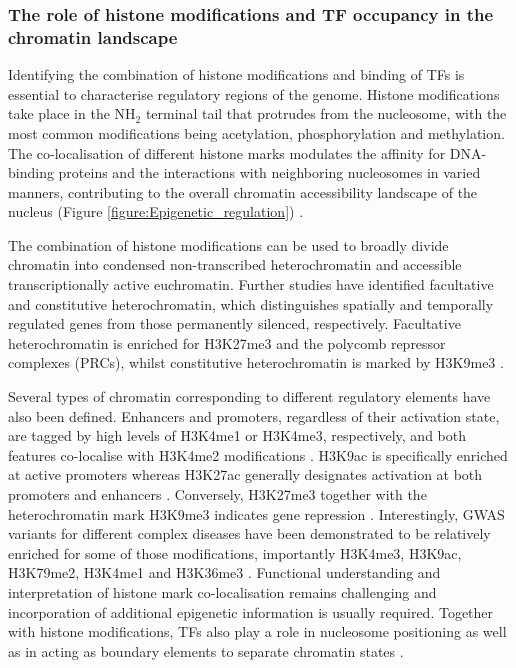 \subsubsection{The role of histone modifications and TF occupancy in the chromatin landscape}

Identifying the combination of histone modifications and binding of TFs is essential to characterise regulatory regions of the genome. Histone modifications take place in the NH$_2$ terminal tail that protrudes from the nucleosome, with the most common modifications being acetylation, phosphorylation and methylation. The co-localisation of different histone marks modulates the affinity for DNA-binding proteins and the interactions with neighboring nucleosomes in varied manners, contributing to the overall chromatin accessibility landscape of the nucleus (Figure \ref{figure:Epigenetic_regulation}) \parencite{Jenuwein2001, Bannister2011}.

The combination of histone modifications can be used to broadly divide chromatin into condensed non-transcribed heterochromatin and accessible transcriptionally active euchromatin. Further studies have identified facultative and constitutive heterochromatin, which distinguishes spatially and temporally regulated genes from those permanently silenced, respectively. Facultative heterochromatin is enriched for H3K27me3 and the polycomb repressor complexes (PRCs), whilst constitutive heterochromatin is marked by H3K9me3 \parencite{Hansen2008,Bannister2001}.

Several types of chromatin corresponding to different regulatory elements have also been defined. Enhancers and promoters, regardless of their activation state, are tagged by high levels of H3K4me1 or H3K4me3, respectively, and both features co-localise with H3K4me2 modifications \parencite{Heintzman2007,Hon2009}. H3K9ac is specifically enriched at active promoters whereas H3K27ac generally designates activation at both promoters and enhancers \parencite{Hon2009,Creyghton2010}. Conversely, H3K27me3 together with the heterochromatin mark H3K9me3 indicates gene repression \parencite{Hansen2008,Bannister2001,Pan2007}. Interestingly, GWAS variants for different complex diseases have been demonstrated to be relatively enriched for some of those modifications, importantly H3K4me3, H3K9ac, H3K79me2, H3K4me1 and H3K36me3 \parencite{Ernst2011, Trynka2013}. Functional understanding and interpretation of histone mark co-localisation remains challenging and incorporation of additional epigenetic information is usually required. 
Together with histone modifications, TFs also play a role in nucleosome positioning as well as in acting as boundary elements to separate chromatin states \parencite{Vierstra2014,Zhang2009,Bell2000}. %

